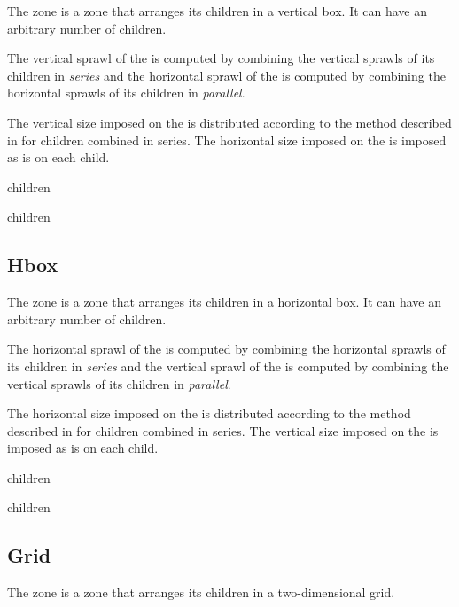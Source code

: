 The  zone is a zone that arranges its children in a
vertical box.  It can have an arbitrary number of children.

The vertical sprawl of the  is computed by combining the
vertical sprawls of its children in \emph{series} and the horizontal
sprawl of the  is computed by combining the horizontal
sprawls of its children in \emph{parallel}.

The vertical size imposed on the  is distributed according
to the method described in 
for children combined in series.  The horizontal size imposed on the
 is imposed as is on each child. 


 {children}

 {\rest children}

\subsection{Hbox}
\label{sec-zones-layout-hbox}

The  zone is a zone that arranges its children in a
horizontal box.  It can have an arbitrary number of children.

The horizontal sprawl of the  is computed by combining the
horizontal sprawls of its children in \emph{series} and the vertical
sprawl of the  is computed by combining the vertical
sprawls of its children in \emph{parallel}.

The horizontal size imposed on the  is distributed according
to the method described in 
for children combined in series.  The vertical size imposed on the
 is imposed as is on each child. 


 {children}

 {\rest children}

\subsection{Grid}
\label{sec-zones-layout-grid}

The  zone is a zone that arranges its children in a
two-dimensional grid.  

